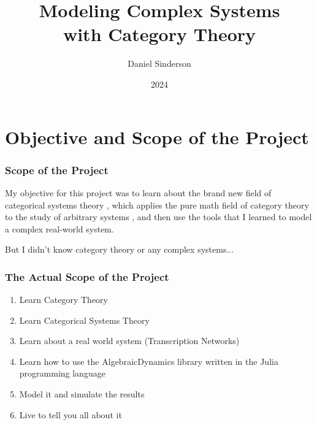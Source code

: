 \documentclass{beamer}
\title{Modeling Complex Systems \\with Category Theory}
\author{Daniel Sinderson}
\institute{Southern Oregon University}
\date{2024}
\begin{document}
\frame{\titlepage}



\section{Objective and Scope of the Project}

\begin{frame}
    \frametitle{Scope of the Project}
    My objective for this project was to learn about the brand new field of categorical systems theory
    , which applies the pure math field of category theory to the study of arbitrary systems
    , and then use the tools that I learned to model a complex real-world system.

    \vspace*{0.25in}

    But I didn't know category theory or any complex systems...
\end{frame}

\begin{frame}
    \frametitle{The Actual Scope of the Project}
    \begin{enumerate}
        \item Learn Category Theory
        \item Learn Categorical Systems Theory
        \item Learn about a real world system (Transcription Networks)
        \item Learn how to use the AlgebraicDynamics library written in the Julia programming language
        \item Model it and simulate the results
        \item Live to tell you all about it
    \end{enumerate}
\end{frame}
\end{document}

